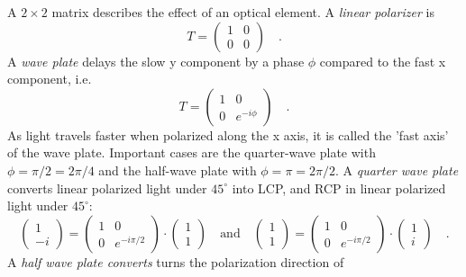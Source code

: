A $2 \times 2$ matrix describes the effect of an optical element. A \emph{linear polarizer} is
\begin{equation}
    T = 
    \begin{pmatrix}
   1 & 0 \\ 0 & 0
    \end{pmatrix}  \quad .
\end{equation}
A \emph{wave plate} delays the slow y component by a phase $\phi$ compared to the fast x component, i.e.
\begin{equation}
    T = 
    \begin{pmatrix}
   1 & 0 \\ 0 & e^{-i \phi}
    \end{pmatrix}  \quad .
\end{equation}
As light travels faster when polarized along the x axis, it is called the 'fast axis' of the wave plate.
Important cases are the quarter-wave plate with $\phi = \pi/2 = 2 \pi / 4$ and the half-wave plate with  $\phi = \pi = 2 \pi / 2$. A \emph{quarter wave plate} converts linear polarized light under $45^\circ $ into LCP, and RCP in linear polarized light under $45^\circ$:
\begin{equation}
    \begin{pmatrix}
        1 \\ -i
     \end{pmatrix}
     = 
    \begin{pmatrix}
        1 & 0 \\ 0 & e^{-i \pi/2}
         \end{pmatrix} \cdot
         \begin{pmatrix}
            1 \\ 1
         \end{pmatrix}
         \quad \text{and} \quad
         \begin{pmatrix}
            1 \\ 1
         \end{pmatrix}
         = 
        \begin{pmatrix}
            1 & 0 \\ 0 & e^{-i \pi/2}
             \end{pmatrix} \cdot
             \begin{pmatrix}
                1 \\ i
             \end{pmatrix} \quad .
\end{equation}
A \emph{half wave plate converts} turns the polarization direction of
